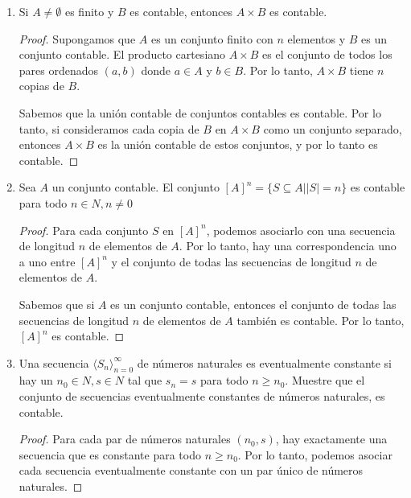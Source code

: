 \documentclass{article}
\begin{document}
\begin{enumerate}
\begin{enumerate}
\begin{proof}
	  Supongamos que $|A_1| = |A_2|$. Esto significa que los conjuntos $A_1$ y $A_2$ tienen la misma cantidad de elementos.

	  Por lo tanto, $|seq(A_1)| =|A_1|^{\aleph_0}$ y $|seq(A_2)| = |A_2|^{\aleph_0}$. Dado que $|A_1| = |A_2|$, podemos concluir que $|seq(A_1)| = |seq(A_2)|$.
	\end{proof}
    \end{enumerate}
  \item Si $A \neq \emptyset$ es finito y $B$ es contable, entonces $A \times B$ es contable.
    
    \begin{proof}
      Supongamos que $A$ es un conjunto finito con $n$ elementos y $B$ es un conjunto contable. El producto cartesiano $A \times B$ es el conjunto de todos los pares ordenados $(a, b)$ donde $a \in A$ y $b \in B$. Por lo tanto, $A \times B$ tiene $n$ copias de $B$.

      Sabemos que la unión contable de conjuntos contables es contable. Por lo tanto, si consideramos cada copia de $B$ en $A \times B$ como un conjunto separado, entonces $A \times B$ es la unión contable de estos conjuntos, y por lo tanto es contable.
    \end{proof}

  \item Sea $A$ un conjunto contable. El conjunto $[A]^{n} = \{S \subseteq A | |S| = n\}$ es contable para todo $n \in N, n \neq 0$
    
    \begin{proof}
      Para cada conjunto $S$ en $[A]^n$, podemos asociarlo con una secuencia de longitud $n$ de elementos de $A$. Por lo tanto, hay una correspondencia uno a uno entre $[A]^n$ y el conjunto de todas las secuencias de longitud $n$ de elementos de $A$.

      Sabemos que si $A$ es un conjunto contable, entonces el conjunto de todas las secuencias de longitud $n$ de elementos de $A$ también es contable. Por lo tanto, $[A]^n$ es contable.
    \end{proof}

  \item Una secuencia $\langle S_n \rangle_{n=0}^{\infty}$ de números naturales es eventualmente constante si hay un $n_0 \in N, s \in N$ tal que $s_n = s$ para todo $n \geq n_0$. Muestre que el conjunto de secuencias eventualmente constantes de números naturales, es contable.
    
    \begin{proof}
      Para cada par de números naturales $(n_0, s)$, hay exactamente una secuencia que es constante para todo $n \geq n_0$. Por lo tanto, podemos asociar cada secuencia eventualmente constante con un par único de números naturales.


\end{proof}
\end{enumerate}
\end{document}
